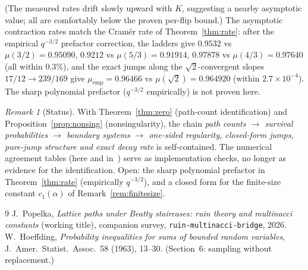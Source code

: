\documentclass[11pt]{article}
\theoremstyle{definition}
\theoremstyle{remark}
\newtheorem{remark}[theorem]{Remark}
\begin{document}
\smallskip\noindent
(The measured rates drift slowly upward with $K$, suggesting a nearby
asymptotic value; all are comfortably below the proven per-flip bound.)
The asymptotic contraction rates match the Cram\'er rate of
Theorem~\ref{thm:rate}: after the empirical $q^{-3/2}$ prefactor
correction, the ladders give $0.9532$ vs $\mu(3/2) = 0.95090$,
$0.9212$ vs $\mu(5/3) = 0.91914$, $0.97878$ vs $\mu(4/3) = 0.97640$
(all within $0.3\%$), and the exact jumps along the $\sqrt2$-convergent
slopes $17/12 \to 239/169$ give
$\mu_{\mathrm{emp}} = 0.96466$ vs $\mu(\sqrt2) = 0.964920$
(within $2.7 \times 10^{-4}$).
The sharp polynomial prefactor ($q^{-3/2}$ empirically) is not proven
here.

\begin{remark}[Status]
With Theorem~\ref{thm:zero} (path-count identification) and
Proposition~\ref{prop:nonsing} (nonsingularity), the chain
\emph{path counts $\to$ survival probabilities $\to$ boundary systems
$\to$ one-sided regularity, closed-form jumps, pure-jump structure and
exact decay rate} is self-contained.
The numerical agreement tables (here and in~\cite{bridge}) serve as
implementation checks, no longer as evidence for the identification.
Open: the sharp polynomial prefactor in Theorem~\ref{thm:rate}
(empirically $q^{-3/2}$), and a closed form for the finite-size
constant $c_1(\alpha)$ of Remark~\ref{rem:finitesize}.
\end{remark}

\begin{thebibliography}{9}
J.~Popelka,
\emph{Lattice paths under Beatty staircases: ruin theory and multinacci
constants} (working title),
companion survey, \texttt{ruin-multinacci-bridge}, 2026.
W.~Hoeffding,
\emph{Probability inequalities for sums of bounded random variables},
J.~Amer.\ Statist.\ Assoc.\ 58 (1963), 13--30.
(Section~6: sampling without replacement.)
\end{thebibliography}
\end{document}
